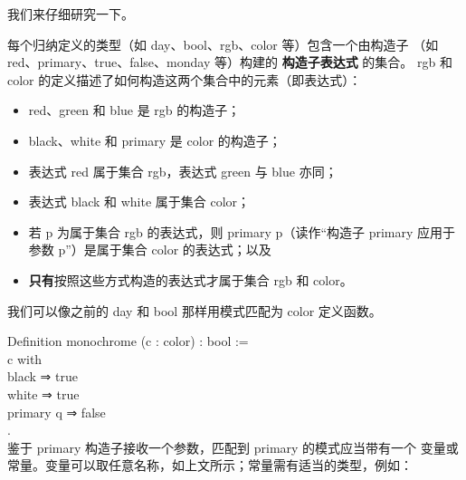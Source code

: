 \documentclass[utf8]{ctexart}
\providecommand{\tightlist}{%
  \setlength{\itemsep}{0pt}\setlength{\parskip}{0pt}}
\begin{document}
我们来仔细研究一下。

每个归纳定义的类型（如 {{day}}、{{bool}}、{{rgb}}、{{color}}
等）包含一个由构造子 （如
{{red}}、{{primary}}、{{true}}、{{false}}、{{monday}} 等）构建的
\textbf{构造子表达式} 的集合。 {{rgb}} 和 {{color}}
的定义描述了如何构造这两个集合中的元素（即表达式）：

\begin{itemize}
\tightlist
\item
  {{red}}、{{green}} 和 {{blue}} 是 {{rgb}} 的构造子；
\item
  {{black}}、{{white}} 和 {{primary}} 是 {{color}} 的构造子；
\item
  表达式 {{red}} 属于集合 {{rgb}}，表达式 {{green}} 与 {{blue}} 亦同；
\item
  表达式 {{black}} 和 {{white}} 属于集合 {{color}}；
\item
  若 {{p}} 为属于集合 {{rgb}} 的表达式，则 {{primary}}
  {{p}}（读作``构造子 {{primary}} 应用于参数 {{p}}''）是属于集合
  {{color}} 的表达式；以及
\item
  \textbf{只有}按照这些方式构造的表达式才属于集合 {{rgb}} 和 {{color}}。
\end{itemize}

我们可以像之前的 {{day}} 和 {{bool}} 那样用模式匹配为 {{color}}
定义函数。

{Definition} {monochrome} ({c} : {color}) : {bool} :=\\
\hspace*{0.333em}\hspace*{0.333em}{match} {c} {with}\\
\hspace*{0.333em}\hspace*{0.333em}\textbar{} {black} ⇒ {true}\\
\hspace*{0.333em}\hspace*{0.333em}\textbar{} {white} ⇒ {true}\\
\hspace*{0.333em}\hspace*{0.333em}\textbar{} {primary} {q} ⇒ {false}\\
\hspace*{0.333em}\hspace*{0.333em}{end}.\\

鉴于 {{primary}} 构造子接收一个参数，匹配到 {{primary}}
的模式应当带有一个
变量或常量。变量可以取任意名称，如上文所示；常量需有适当的类型，例如：
\end{document}
